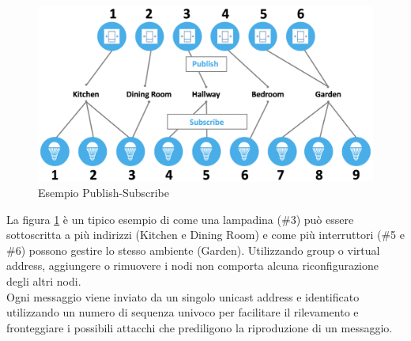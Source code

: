 \begin{figure}[!ht]
    \centering
    \includegraphics[width = \textwidth]{images/Publish_Subscribe_BLE.png}
    \caption{Esempio Publish-Subscribe}
    \label{fig:publish_subscribe_ble}
\end{figure}

\noindent La figura \ref{fig:publish_subscribe_ble} è un tipico esempio di come una lampadina (\#3) può essere sottoscritta a più indirizzi (Kitchen e Dining Room) e come più interruttori (\#5 e \#6) possono gestire lo stesso ambiente (Garden). Utilizzando group o virtual address, aggiungere o rimuovere i nodi non comporta alcuna riconfigurazione degli altri nodi.\\

\noindent Ogni messaggio viene inviato da un singolo unicast address e identificato utilizzando un numero di sequenza univoco per facilitare il rilevamento e fronteggiare i possibili attacchi che prediligono la riproduzione di un messaggio.



